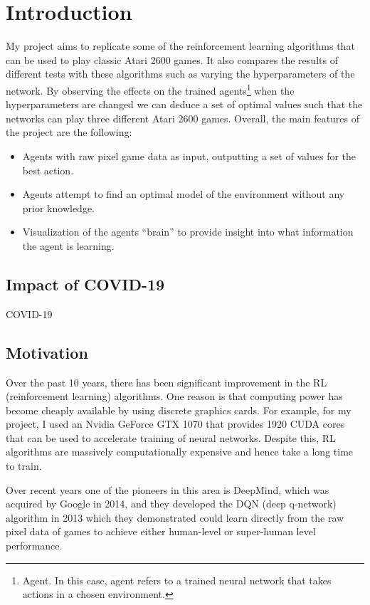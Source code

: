 \chapter{Introduction}
\label{cha:intro}
My project aims to replicate some of the reinforcement learning algorithms that can be used to play classic Atari 2600 games. It also compares the results of different tests with these algorithms such as varying the hyperparameters of the network. By observing the effects on the trained agents\footnote{Agent. In this case, agent refers to a trained neural network that takes actions in a chosen environment.} when the hyperparameters are changed we can deduce a set of optimal values such that the networks can play three different Atari 2600 games. Overall, the main features of the project are the following:
\begin{itemize}
	\item Agents with raw pixel game data as input, outputting a set of values for the best action.
	\item Agents attempt to find an optimal model of the environment without any prior knowledge.
	\item Visualization of the agents ``brain'' to provide insight into what information the agent is learning.
\end{itemize}

\section{Impact of COVID-19}
COVID-19

\section{Motivation}
\label{intro:sec:moti}
Over the past 10 years, there has been significant improvement in the RL (reinforcement learning) algorithms. One reason is that computing power has become cheaply available by using discrete graphics cards. For example, for my project, I used an Nvidia GeForce GTX 1070 that provides 1920 CUDA cores that can be used to accelerate training of neural networks. Despite this, RL algorithms are massively computationally expensive and hence take a long time to train.

Over recent years one of the pioneers in this area is DeepMind, which was acquired by Google in 2014, and they developed the DQN (deep q-network) algorithm in 2013 which they demonstrated could learn directly from the raw pixel data of games to achieve either human-level or super-human level performance.

